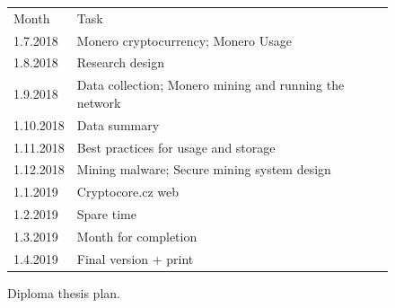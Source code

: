\documentclass[
  printed, %
  table,   %
  nolof,     %
  nolot,     %
           oneside, color
]{fithesis3}
\begin{document}
\begin{figure}[H]
\center
\begin{tabular}{ll}
Month     & Task                                              \\
1.7.2018  & Monero cryptocurrency; Monero Usage              \\
1.8.2018  & Research design  \\
1.9.2018  & Data collection; Monero mining and running the network \\
1.10.2018 & Data summary                                   \\
1.11.2018 & Best practices for usage and storage                \\
1.12.2018 & Mining malware; Secure mining system design     \\
1.1.2019  & Cryptocore.cz web            \\
1.2.2019  & Spare time                                           \\
1.3.2019  & Month for completion                                 \\
1.4.2019  & Final version + print                            
\end{tabular}
\caption{Diploma thesis plan.}
\label{ssme-thesis-plan}
\end{figure}



\printbibliography[heading=bibintoc]

\appendix
\listofappendices
\end{document}

